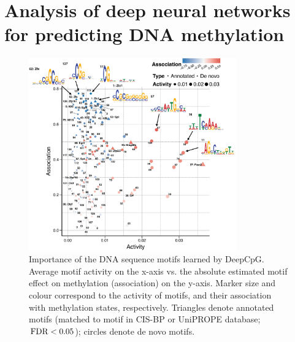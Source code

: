
\chapter{Analysis of deep neural networks for predicting DNA methylation}

\ifpdf
    \graphicspath{{Chapter5/Figs/Raster/}{Chapter5/Figs/PDF/}{Chapter5/Figs/}}
\else
    \graphicspath{{Chapter5/Figs/Vector/}{Chapter5/Figs/}}
\fi

\begin{figure}[htbp!]
\centering
\includegraphics[width=0.8\textwidth]{motifs_imp}
\caption[Importance of the DNA sequence motifs learned by DeepCpG.]{Importance of the DNA sequence motifs learned by DeepCpG. Average motif activity on the x-axis vs. the absolute estimated motif effect on methylation (association) on the y-axis. Marker size and colour correspond to the activity of motifs, and their association with methylation states, respectively. Triangles denote annotated motifs (matched to motif in CIS-BP or UniPROPE database; $\operatorname{FDR}<0.05$); circles denote de novo motifs.}
\label{fig:dcpg_motifs_imp}
\end{figure}

